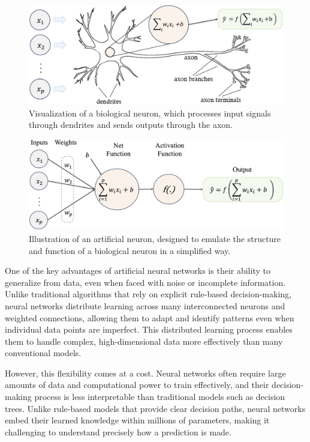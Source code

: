 \documentclass[
  11pt,
]{book}
\theoremstyle{definition}
\theoremstyle{definition}
\theoremstyle{definition}
\theoremstyle{definition}
\theoremstyle{remark}
\begin{document}
\begin{figure}[H]

{\centering \includegraphics[width=0.75\linewidth]{images/ch12_net_brain} 

}

\caption{Visualization of a biological neuron, which processes input signals through dendrites and sends outputs through the axon.}\label{fig:net-brain}
\end{figure}

\begin{figure}[H]

{\centering \includegraphics[width=0.9\linewidth]{images/ch12_net_1} 

}

\caption{Illustration of an artificial neuron, designed to emulate the structure and function of a biological neuron in a simplified way.}\label{fig:net-1}
\end{figure}

One of the key advantages of artificial neural networks is their ability to generalize from data, even when faced with noise or incomplete information. Unlike traditional algorithms that rely on explicit rule-based decision-making, neural networks distribute learning across many interconnected neurons and weighted connections, allowing them to adapt and identify patterns even when individual data points are imperfect. This distributed learning process enables them to handle complex, high-dimensional data more effectively than many conventional models.

However, this flexibility comes at a cost. Neural networks often require large amounts of data and computational power to train effectively, and their decision-making process is less interpretable than traditional models such as decision trees. Unlike rule-based models that provide clear decision paths, neural networks embed their learned knowledge within millions of parameters, making it challenging to understand precisely how a prediction is made.
\end{document}
